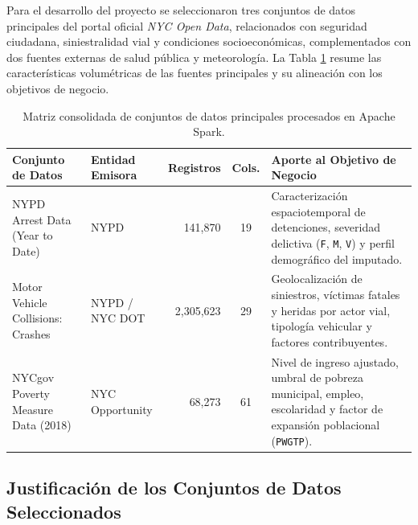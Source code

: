 \documentclass[11pt,a4paper]{article}
\begin{document}
Para el desarrollo del proyecto se seleccionaron tres conjuntos de datos principales del portal oficial \textit{NYC Open Data}, relacionados con seguridad ciudadana, siniestralidad vial y condiciones socioeconómicas, complementados con dos fuentes externas de salud pública y meteorología. La Tabla \ref{tab:seleccion_datos} resume las características volumétricas de las fuentes principales y su alineación con los objetivos de negocio.

\begin{table}[H]
\centering
\small
\renewcommand{\arraystretch}{1.25}
\begin{tabularx}{\textwidth}{p{4.2cm} p{2.8cm} r c X}
\toprule
\textbf{Conjunto de Datos} & \textbf{Entidad Emisora} & \textbf{Registros} & \textbf{Cols.} & \textbf{Aporte al Objetivo de Negocio} \\
\midrule
NYPD Arrest Data (Year to Date) & NYPD & 141,870 & 19 & Caracterización espaciotemporal de detenciones, severidad delictiva (\texttt{F}, \texttt{M}, \texttt{V}) y perfil demográfico del imputado. \\
Motor Vehicle Collisions: Crashes & NYPD / NYC DOT & 2,305,623 & 29 & Geolocalización de siniestros, víctimas fatales y heridas por actor vial, tipología vehicular y factores contribuyentes. \\
NYCgov Poverty Measure Data (2018) & NYC Opportunity & 68,273 & 61 & Nivel de ingreso ajustado, umbral de pobreza municipal, empleo, escolaridad y factor de expansión poblacional (\texttt{PWGTP}). \\
\bottomrule
\end{tabularx}
\caption{Matriz consolidada de conjuntos de datos principales procesados en Apache Spark.}
\label{tab:seleccion_datos}
\end{table}

\subsection{Justificación de los Conjuntos de Datos Seleccionados}
\end{document}
